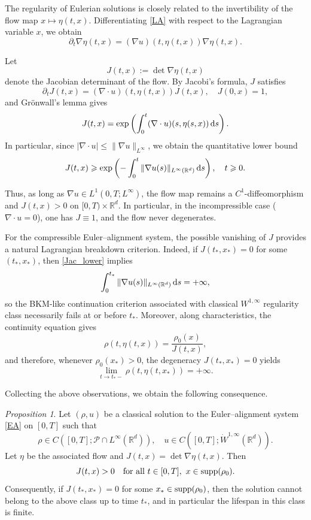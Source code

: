 \documentclass[11pt]{amsart}
\numberwithin{equation}{section}
\newtheorem{proposition}[theorem]{Proposition}
\theoremstyle{definition}
\theoremstyle{remark}
\numberwithin{equation}{section}
\newtheorem{proposition}[theorem]{Proposition}
\newcommand{\R}{\mathbb R}
\newcommand{\bq}{\begin{equation}}
\newcommand{\eq}{\end{equation}}
\newcommand{\lt}{\left}
\newcommand{\rt}{\right}
\newcommand{\pa}{\partial}
\newcommand{\calP}{\mathcal P}
\newcommand{\ds}{\textnormal{d}s}
\newcommand{\supp}{{\rm supp}}
\renewcommand{\ge}{\geqslant}
\renewcommand{\le}{\leqslant}
\begin{document}
The regularity of Eulerian solutions is closely related to the invertibility of the flow map $x\mapsto \eta(t,x)$. Differentiating \eqref{LA} with respect to the Lagrangian variable $x$, we obtain 
\[
\pa_t \nabla \eta(t,x) = (\nabla u)(t,\eta(t,x))  \nabla \eta(t,x).
\]

Let
\[
J(t,x):=\det\nabla\eta(t,x)
\]
denote the Jacobian determinant of the flow. By Jacobi's formula, $J$ satisfies
\[
\pa_t J(t,x) = (\nabla \cdot u)(t,\eta(t,x)) J(t,x), \quad J(0,x) = 1,
\]
and Gr\"onwall's lemma gives
\[
J(t,x) = \exp\lt(\int_0^t  (\nabla \cdot u)(s,\eta(s,x))\,\ds\rt).
\]
In particular, since $|\nabla\cdot u|\le \|\nabla u\|_{L^\infty}$, we obtain the
quantitative lower bound
\bq\label{Jac_lower}
J(t,x)\ge \exp \lt(-\int_0^t \|\nabla u(s)\|_{L^\infty(\R^d)}\,\ds\rt), \quad t\ge0.
\eq

Thus, as long as $\nabla u\in L^1(0,T;L^\infty)$, the flow map remains a $C^1$-diffeomorphism
and $J(t,x)>0$ on $[0,T)\times\R^d$. In particular, in the incompressible case
($\nabla\cdot u=0$), one has $J\equiv1$, and the flow never degenerates.


For the compressible Euler--alignment system, the possible vanishing of $J$ provides a natural Lagrangian breakdown criterion. Indeed, if $J(t_*,x_*)=0$ for some $(t_*,x_*)$, then \eqref{Jac_lower} implies
\[
\int_0^{t_*}\|\nabla u(s)\|_{L^\infty(\R^d)}\,\ds = +\infty,
\]
so the  BKM-like continuation criterion  \cite{BKM84} associated with classical $W^{1,\infty}$ regularity class  necessarily fails at or before $t_*$. Moreover, along characteristics, the continuity equation gives
\[
\rho(t,\eta(t,x))=\frac{\rho_0(x)}{J(t,x)},
\]
and therefore, whenever $\rho_0(x_*)>0$, the degeneracy $J(t_*,x_*)=0$ yields
\[
\lim_{t\to t_*-}\rho(t,\eta(t,x_*))=+\infty.
\]

Collecting the above observations, we obtain the following consequence.

\begin{proposition} 
Let $(\rho,u)$ be a classical solution to the Euler--alignment system \eqref{EA} on $[0,T]$ such that
\[
\rho\in C([0,T];\calP \cap L^\infty(\R^d)), \quad u\in C([0,T];\dot W^{1,\infty}(\R^d)).
\]
Let $\eta$ be the associated flow and $J(t,x)=\det\nabla\eta(t,x)$. Then
\[
J(t,x)>0 \quad \text{for all } t\in[0,T],\ x\in\supp(\rho_0).
\]
Consequently, if $J(t_*,x_*)=0$ for some $x_*\in\supp(\rho_0)$, then the solution cannot belong to the above class up to time $t_*$, and in particular the lifespan in this class is finite.
\end{proposition}
\end{document}

